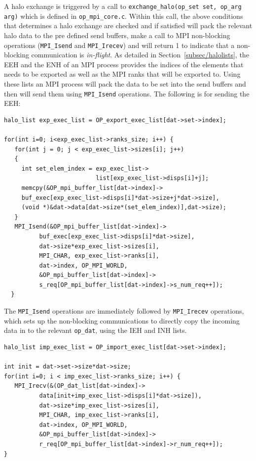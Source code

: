 \documentclass[11pt]{article}
\begin{document}
\noindent A halo exchange is triggered by a call to \texttt{exchange\_halo(op\_set set, op\_arg arg)} which is defined
in \texttt{op\_mpi\_core.c}. Within this call, the above conditions that determines a halo exchange are checked and if
satisfied will pack the relevant halo data to the pre defined send buffers, make a call to MPI non-blocking
operations (\texttt{MPI\_Isend} and \texttt{MPI\_Irecev}) and will return 1 to indicate that a non-blocking
communication is \textit{in-flight}. As detailed in Section~\ref{subsec/halolists}, the EEH and the ENH of an MPI
process provides the indices of the elements that needs to be exported as well as the MPI ranks that will be exported
to. Using these lists an MPI process will pack the data to be set into the send buffers and then will send them using
\texttt{MPI\_Isend} operations. The following is for sending the EEH:

\begin{verbatim}
halo_list exp_exec_list = OP_export_exec_list[dat->set->index];

for(int i=0; i<exp_exec_list->ranks_size; i++) {
   for(int j = 0; j < exp_exec_list->sizes[i]; j++)
   {
     int set_elem_index = exp_exec_list->
                          list[exp_exec_list->disps[i]+j];
     memcpy(&OP_mpi_buffer_list[dat->index]->
     buf_exec[exp_exec_list->disps[i]*dat->size+j*dat->size],
     (void *)&dat->data[dat->size*(set_elem_index)],dat->size);
   }
   MPI_Isend(&OP_mpi_buffer_list[dat->index]->
          buf_exec[exp_exec_list->disps[i]*dat->size],
          dat->size*exp_exec_list->sizes[i],
          MPI_CHAR, exp_exec_list->ranks[i],
          dat->index, OP_MPI_WORLD,
          &OP_mpi_buffer_list[dat->index]->
          s_req[OP_mpi_buffer_list[dat->index]->s_num_req++]);
  }
\end{verbatim}
\noindent The \texttt{MPI\_Isend} operations are immediately followed by \texttt{MPI\_Irecev} operations, which sets up
the non-blocking communications to directly copy the incoming data in to the relevant \texttt{op\_dat}, using the IEH
and INH lists.
\begin{verbatim}
halo_list imp_exec_list = OP_import_exec_list[dat->set->index];

int init = dat->set->size*dat->size;
for(int i=0; i < imp_exec_list->ranks_size; i++) {
   MPI_Irecv(&(OP_dat_list[dat->index]->
          data[init+imp_exec_list->disps[i]*dat->size]),
          dat->size*imp_exec_list->sizes[i],
          MPI_CHAR, imp_exec_list->ranks[i],
          dat->index, OP_MPI_WORLD,
          &OP_mpi_buffer_list[dat->index]->
          r_req[OP_mpi_buffer_list[dat->index]->r_num_req++]);
}
\end{verbatim}
\end{document}
